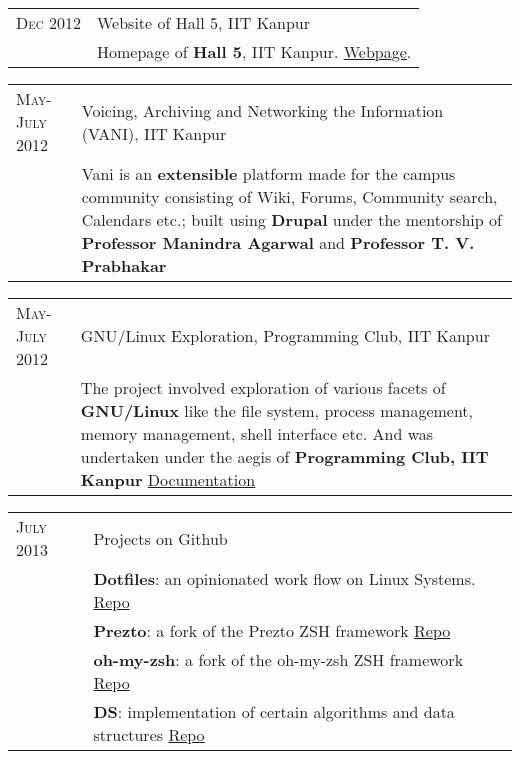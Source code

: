 \documentclass[a4paper,10pt]{article} %
\begin{document}
\begin{tabular}{p{2.2cm}|p{11cm}}
    \textsc{Dec 2012} & Website of Hall 5, IIT Kanpur\\
                      & \footnotesize{Homepage of \textbf{Hall 5}, IIT Kanpur.
                         \href{http://www.iitk.ac.in/hall5} {Webpage}. } \\
\end{tabular}

\begin{tabular}{p{2.2cm}|p{11cm}}
    \textsc{May-July 2012} & Voicing, Archiving and Networking the Information \textsc{(VANI)}, IIT Kanpur\\
                           & \footnotesize{Vani is an \textbf{extensible} platform
                              made for the campus community consisting of Wiki, Forums,
                              Community search, Calendars etc.; built using \textbf{Drupal}
                              under the mentorship of \textbf{Professor Manindra Agarwal} and
                              \textbf{Professor T. V. Prabhakar} } \\
\end{tabular}

\begin{tabular}{p{2.2cm}|p{11cm}}
    \textsc{May-July 2012} & GNU/Linux Exploration, Programming Club, IIT Kanpur\\
                           & \footnotesize{ The project involved exploration of various facets of
                             \textbf{GNU/Linux} like the file system, process management,
                             memory management, shell interface etc. And was
                             undertaken under the aegis of \textbf{Programming Club, IIT Kanpur}
                             \href{https://docs.google.com/document/d/1ZHO9w36aoq3oaZBR4Um1AOmDfiTDAEgM6baQAu3icw4/edit?usp=sharing} 
                             {Documentation} } \\
\end{tabular}

\begin{tabular}{p{2.2cm}|p{11cm}}
    \textsc{July 2013} & Projects on Github \\
                       & \footnotesize{\textbf{Dotfiles}: an opinionated work flow on Linux Systems.
                          \href{https://github.com/srijanshetty/dotfiles} {Repo} } \\
                       & \footnotesize{\textbf{Prezto}: a fork of the Prezto ZSH framework
                          \href{https://github.com/srijanshetty/prezto} {Repo}} \\
                       & \footnotesize {\textbf{oh-my-zsh}: a fork of the oh-my-zsh ZSH framework
                          \href{https://github.com/srijanshetty/oh-my-zsh} {Repo} } \\
                       & \footnotesize{\textbf{DS}: implementation of certain algorithms and data structures
                          \href{https://github.com/srijanshetty/DS} {Repo}} \\
\end{tabular}
\end{document}
